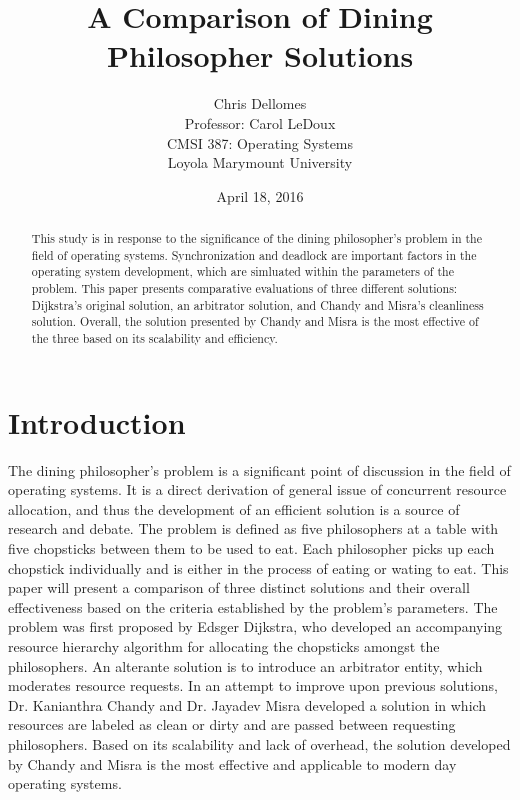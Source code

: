 \documentclass{article}
\begin{document}
\title{A Comparison of Dining Philosopher Solutions}
\author{Chris Dellomes\\
Professor: Carol LeDoux\\
CMSI 387: Operating Systems\\
	Loyola Marymount University}

\date{April 18, 2016}

\maketitle

\begin{center}
\begin{abstract}
This study is in response to the significance of the dining philosopher's problem in the field of operating systems. Synchronization and deadlock are important factors in the operating system development, which are simluated within the parameters of the problem. This paper presents comparative evaluations of three different solutions: Dijkstra's original solution, an arbitrator solution, and Chandy and Misra's cleanliness solution. Overall, the solution presented by Chandy and Misra is the most effective of the three based on its scalability and efficiency.
\end{abstract}
\end{center}

\thispagestyle{empty}

\clearpage

\setcounter{page}{1}

\section{Introduction} The dining philosopher's problem is a significant point of discussion in the field of operating systems. It is a direct derivation of general issue of concurrent resource allocation, and thus the development of an efficient solution is a source of research and debate. The problem is defined as five philosophers at a table with five chopsticks between them to be used to eat. Each philosopher picks up each chopstick individually and is either in the process of eating or wating to eat. This paper will present a comparison of three distinct solutions and their overall effectiveness based on the criteria established by the problem's parameters. The problem was first proposed by Edsger Dijkstra, who developed an accompanying resource hierarchy algorithm for allocating the chopsticks amongst the philosophers. An alterante solution is to introduce an arbitrator entity, which moderates resource requests. In an attempt to improve upon previous solutions, Dr. Kanianthra Chandy and Dr. Jayadev Misra developed a solution in which resources are labeled as clean or dirty and are passed between requesting philosophers. Based on its scalability and lack of overhead, the solution developed by Chandy and Misra is the most effective and applicable to modern day operating systems.
\end{document}
